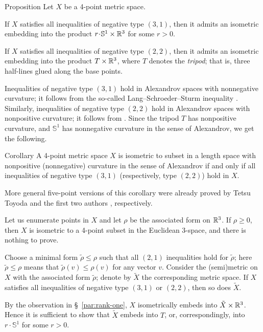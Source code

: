 \documentclass[a4paper,10pt]{article}
\begin{document}
\begin{thm}{Proposition}
Let $X$ be a 4-point metric space.

If $X$ satisfies all inequalities of negative type $(3, 1)$, then it admits an isometric embedding into the product $r\cdot \mathbb{S}^1\times\RR^3$ for some $r>0$.

If $X$ satisfies all inequalities of negative type $(2, 2)$, then it admits an isometric embedding into the product $T\times\mathbb{R}^3$, where $T$ denotes the \emph{tripod};
that is, three half-lines glued along the base points.
\end{thm}

Inequalities of negative type $(3, 1)$ hold in Alexandrov spaces with nonnegative curvature; it follows from the so-called Lang--Schroeder--Sturm inequality \cite{lang-schroeder, sturm}.
Similarly, inequalities of negative type $(2, 2)$ hold in Alexandrov spaces with nonpositive curvature; it follows from \cite[9.5]{AKP-2024}.
Since the tripod $T$ has nonpositive curvature, and $\mathbb{S}^1$ has nonnegative curvature in the sense of Alexandrov, we get the following.

\begin{thm}{Corollary}
A 4-point metric space $X$ is isometric to subset in a length space with nonpositive (nonnegative) curvature in the sense of Alexandrov if and only if all inequalities of negative type $(3, 1)$ (respectively, type $(2, 2)$) hold in $X$.
\end{thm}

More general five-point versions of this corollary were already proved by Tetsu Toyoda \cite{toyoda,lebedeva-petrunin2021} and the first two authors \cite{lebedeva-petrunin-2024}, respectively.


Let us enumerate points in $X$ and let $\rho$ be the associated form on $\mathbb{R}^3$.
If $\rho\ge 0$, then $X$ is isometric to a 4-point subset in the Euclidean 3-space,
and there is nothing to prove.

Choose a minimal form $\tilde\rho\le \rho$ such that all $(2,1)$ inequalities hold for $\tilde\rho$;
here $\tilde\rho\le \rho$ means that $\tilde\rho(v)\le \rho(v)$ for any vector $v$.
Consider the (semi)metric on $X$ with the associated form $\tilde\rho$; denote by
$\tilde X$ the corresponding metric space.
If $X$ satisfies all inequalities of negative type $(3, 1)$ or $(2,2)$, then so does $\tilde X$.

By the observation in §~\ref{par:rank-one}, $X$ isometrically embeds into $\tilde X\times \mathbb{R}^3$.
Hence it is sufficient to show that $\tilde X$ embeds into $T$, or, correspondingly, into $r\cdot \mathbb{S}^1$ for some $r>0$.
\end{document}
